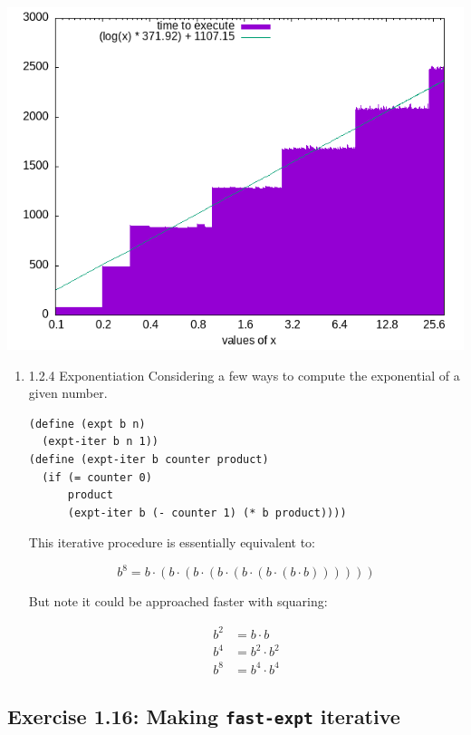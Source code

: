 \documentclass[final,fleqn,titlepage,twoside]{article}
\begin{document}
\begin{center}
\includegraphics[width=.9\linewidth]{1/fig/1-15-bench.png}
\end{center}

\begin{enumerate}
\item 1.2.4 Exponentiation
\label{sec:orgb789366}
Considering a few ways to compute the exponential of a given number.

\begin{verbatim}
(define (expt b n)
  (expt-iter b n 1))
(define (expt-iter b counter product)
  (if (= counter 0)
      product
      (expt-iter b (- counter 1) (* b product))))
\end{verbatim}

This iterative procedure is essentially equivalent to:

\[b^{8} = b \cdot (b \cdot (b \cdot (b \cdot (b \cdot (b \cdot (b \cdot b))))))\]

But note it could be approached faster with squaring:

\[\begin{aligned}b^2 &= b \cdot b\\
b^4 &= b^2\cdot b^2\\
b^8 &= b^4 \cdot b^4\end{aligned}\]
\end{enumerate}

\subsection{Exercise 1.16: Making \texttt{fast-expt} iterative}
\label{sec:org366d867}
\end{document}
